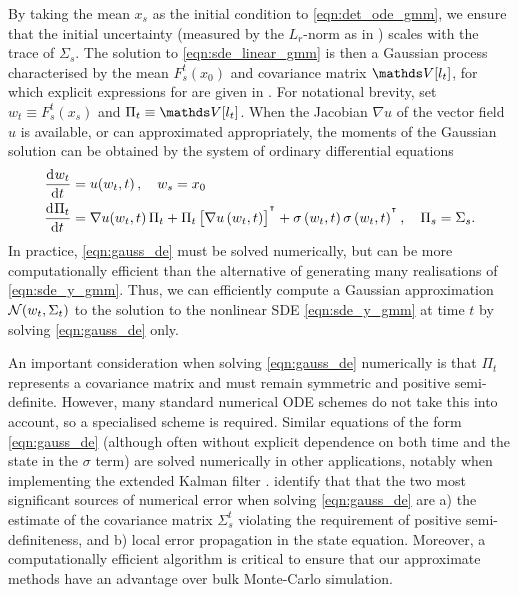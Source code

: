 By taking the mean \(x_s\) as the initial condition to \cref{eqn:det_ode_gmm}, we ensure that the initial uncertainty (measured by the \(L_r\)-norm as in ) scales with the trace of \(\Sigma_s\).
The solution to \cref{eqn:sde_linear_gmm} is then a Gaussian process characterised by the mean \(F_s^t\!\left(x_0\right)\) and covariance matrix \(\var{l_t}\), for which explicit expressions for are given in .
For notational brevity, set \(w_t \equiv F_s^t\!\left(x_s\right)\) and \(\Pi_t \equiv \var{l_t}\).
When the Jacobian \(\nabla u\) of the vector field \(u\) is available, or can approximated appropriately, the moments of the Gaussian solution can be obtained by the system of ordinary differential equations
\begin{subequations}\label{eqn:gauss_de}
	\begin{align}
		\dod{w_t}{t}   & = u\!\left(w_t, t\right), \quad w_s = x_0 \label{eqn:gauss_mean_de}                                                                                                           \\
		\dod{\Pi_t}{t} & = \begin{multlined}[t]
			                   \nabla u\!\left(w_t, t\right) \Pi_t + \Pi_t\left[\nabla u\left(w_t, t\right)\right]^{\T} + \sigma\left(w_t, t \right)\sigma\left(w_t, t\right)^{\T}, \quad \Pi_s = \Sigma_s.
		                   \end{multlined}
		\label{eqn:gauss_cov_de}
	\end{align}
\end{subequations}
In practice, \cref{eqn:gauss_de} must be solved numerically, but can be more computationally efficient than the alternative of generating many realisations of \cref{eqn:sde_y_gmm}.
Thus, we can efficiently compute a Gaussian approximation \(\mathcal{N}\!\left(w_t, \Sigma_t\right)\) to the solution to the nonlinear SDE \cref{eqn:sde_y_gmm} at time \(t\) by solving \cref{eqn:gauss_de} only.

An important consideration  when solving \cref{eqn:gauss_de} numerically is that \(\Pi_t\) represents a covariance matrix and must remain symmetric and positive semi-definite.
However, many standard numerical ODE schemes do not take this into account, so a specialised scheme is required.
Similar equations of the form \cref{eqn:gauss_de} (although often without explicit dependence on both time and the state in the \(\sigma\) term) are solved numerically in other applications, notably when implementing the extended Kalman filter \citep{Jazwinski_2014_StochasticProcessesFiltering, KulikovaKulikov_2014_AdaptiveODESolvers}.
\citet{KulikovaKulikov_2014_AdaptiveODESolvers} identify that that the two most significant sources of numerical error when solving \cref{eqn:gauss_de} are a) the estimate of the covariance matrix \(\Sigma_s^t\) violating the requirement of positive semi-definiteness, and b) local error propagation in the state equation.
Moreover, a computationally efficient algorithm is critical to ensure that our approximate methods have an advantage over bulk Monte-Carlo simulation.

